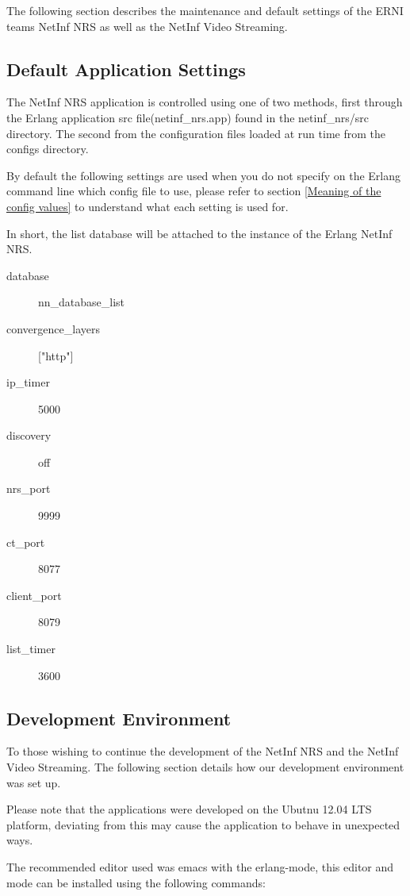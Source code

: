 The following section describes the maintenance and default settings of the ERNI teams NetInf NRS as well as the NetInf Video Streaming.

\subsection{Default Application Settings}

The NetInf NRS application is controlled using one of two methods, first through the Erlang application src file(netinf\_nrs.app) found in the netinf\_nrs/src directory. The second from the configuration files loaded at run time from the configs directory. 

By default the following settings are used when you do not specify on the Erlang command line which config file to use, please refer to section \ref{Meaning of the config values} to understand what each setting is used for. 

In short, the list database will be attached to the instance of the Erlang NetInf NRS.

\begin{description}
\item[database]
nn\_database\_list
\item[convergence\_layers]
["http"]
\item[ip\_timer]
5000
\item[discovery]
off
\item[nrs\_port]
9999
\item[ct\_port]
8077
\item[client\_port]
8079
\item[list\_timer]
3600
\end{description}

\subsection {Development Environment}

To those wishing to continue the development of the NetInf NRS and the NetInf Video Streaming. The following section details how our development environment was set up. 

Please note that the applications were developed on the Ubutnu 12.04 LTS platform, deviating from this may cause the application to behave in unexpected ways.

The recommended editor used was emacs with the erlang-mode, this editor and mode can be installed using the following commands:

